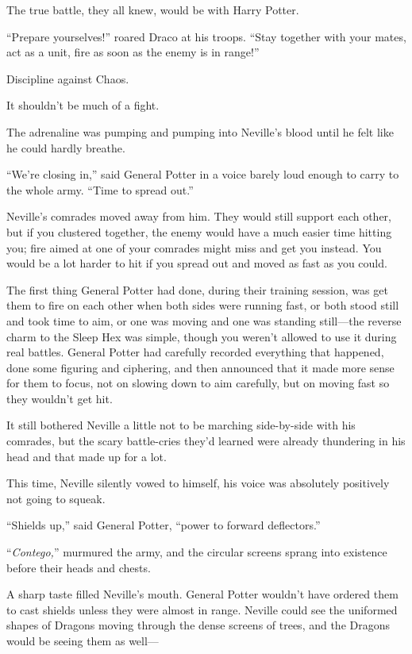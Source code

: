The true battle, they all knew, would be with Harry Potter.

“Prepare yourselves!” roared Draco at his troops. “Stay together with your mates, act as a unit, fire as soon as the enemy is in range!”

Discipline against Chaos.

It shouldn’t be much of a fight.

\later

The adrenaline was pumping and pumping into Neville’s blood until he felt like he could hardly breathe.

“We’re closing in,” said General Potter in a voice barely loud enough to carry to the whole army. “Time to spread out.”

Neville’s comrades moved away from him. They would still support each other, but if you clustered together, the enemy would have a much easier time hitting you; fire aimed at one of your comrades might miss and get you instead. You would be a lot harder to hit if you spread out and moved as fast as you could.

The first thing General Potter had done, during their training session, was get them to fire on each other when both sides were running fast, or both stood still and took time to aim, or one was moving and one was standing still—the reverse charm to the Sleep Hex was simple, though you weren’t allowed to use it during real battles. General Potter had carefully recorded everything that happened, done some figuring and ciphering, and then announced that it made more sense for them to focus, not on slowing down to aim carefully, but on moving fast so they wouldn’t get hit.

It still bothered Neville a little not to be marching side-by-side with his comrades, but the scary battle-cries they’d learned were already thundering in his head and that made up for a lot.

This time, Neville silently vowed to himself, his voice was absolutely positively not going to squeak.

“Shields up,” said General Potter, “power to forward deflectors.”

“\emph{Contego,}” murmured the army, and the circular screens sprang into existence before their heads and chests.

A sharp taste filled Neville’s mouth. General Potter wouldn’t have ordered them to cast shields unless they were almost in range. Neville could see the uniformed shapes of Dragons moving through the dense screens of trees, and the Dragons would be seeing them as well—

